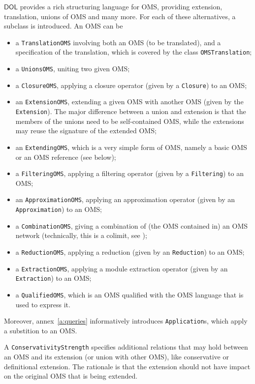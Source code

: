 \documentclass[10pt,fleqn,final]{scrreprt}
\newcommand*{\syntax}[1]{\texttt{#1}}
\newcommand*{\DOL}{\ensuremath{\mathsf{DOL}}\xspace}
\newenvironment{definitions}[0]{\medskip }{}
\begin{document}
\begin{definitions}
\DOL provides a rich structuring language for OMS, providing
extension, translation, unions of OMS and many more.  For each of
these alternatives, a subclass is introduced. An OMS can be
\begin{itemize}
\item a \syntax{TranslationOMS} involving both
an OMS (to be translated), and a specification of the translation,
which is covered by the class \syntax{OMSTranslation};
\item a \syntax{UnionsOMS}, uniting two given OMS; 
\item a \syntax{ClosureOMS}, applying a closure operator
(given by a \syntax{Closure}) to an OMS; 
\item an \syntax{ExtensionOMS}, extending a given OMS with another OMS
  (given by the \syntax{Extension}). The major difference between a
  union and extension is that the members of the unions need to be
  self-contained OMS, while the extensions may reuse the signature of
  the extended OMS;
\item an \syntax{ExtendingOMS}, which is a very simple form of OMS,
namely a basic OMS or an OMS reference (see below);
\item a \syntax{FilteringOMS}, applying a filtering operator
(given by a \syntax{Filtering}) to an OMS;
\item an \syntax{ApproximationOMS}, applying an approximation operator
(given by an \syntax{Approximation}) to an OMS;
\item a \syntax{CombinationOMS}, giving a combination of (the OMS
  contained in) an OMS network (technically, this is a colimit, see
  \cite{ZimmermanEtAl06});
\item a \syntax{ReductionOMS}, applying a reduction
(given by an \syntax{Reduction}) to an OMS;
\item a \syntax{ExtractionOMS}, applying a module extraction operator
(given by an \syntax{Extraction}) to an OMS;
\item a \syntax{QualifiedOMS}, which is an OMS qualified with the OMS
  language that is used to express it.
\end{itemize}
Moreover, annex~\ref{a:queries}
informatively introduces \syntax{Application}s, which apply a substition
to an OMS.

A \syntax{ConservativityStrength} specifies additional relations that
may hold between an OMS and its extension (or union with other OMS),
like conservative or definitional extension. The rationale is that the
extension should not have impact on the original OMS that is being
extended. 


\end{definitions}
\end{document}

